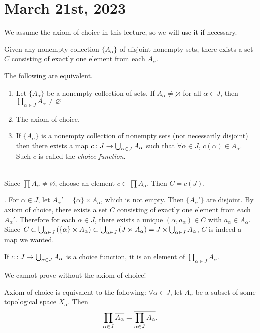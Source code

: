 \section*{March 21st, 2023}

We assume the axiom of choice in this lecture, so we will use it if necessary.

\rmk {} Given any nonempty collection \(\{A_\alpha\}\) of disjoint nonempty sets, there exists a set \(C\) consisting of exactly one element from each \(A_\alpha\).

\rmk The following are equivalent.
\begin{enumerate}
    \item Let \(\{A_\alpha\}\) be a nonempty collection of sets. If \(A_\alpha \neq \varnothing\) for all \(\alpha \in J\), then \(\prod_{\alpha \in J} A_\alpha \neq \varnothing\)
    \item The axiom of choice.
    \item If \(\{A_\alpha\}\) is a nonempty collection of nonempty sets (not necessarily disjoint) then there exists a map \(c : J \rightarrow \bigcup_{\alpha \in J} A_\alpha\) such that \(\forall \alpha \in J\), \(c(\alpha) \in A_\alpha\). Such \(c\) is called the \textit{choice function}.
\end{enumerate}

\pf \\
 Since \(\prod A_\alpha \neq \varnothing\), choose an element \(c \in \prod A_\alpha\). Then \(C = c(J)\).

 . For \(\alpha \in J\), let \(A_\alpha' = \{\alpha\} \times A_\alpha\), which is not empty. Then \(\{A_\alpha'\}\) are disjoint. By axiom of choice, there exists a set \(C\) consisting of exactly one element from each \(A_\alpha'\). Therefore for each \(\alpha \in J\), there exists a unique \((\alpha, a_\alpha) \in C\) with \(a_\alpha \in A_\alpha\). Since \(C \subset \bigcup_{\alpha \in J} \left( \{\alpha\} \times A_\alpha \right) \subset \bigcup_{\alpha \in J} \left( J \times A_\alpha \right) = J \times \bigcup_{\alpha \in J} A_\alpha\), \(C\) is indeed a map we wanted.

 If \(c : J \rightarrow \bigcup_{\alpha \in J} A_\alpha\) is a choice function, it is an element of \(\prod_{\alpha \in J} A_\alpha\).

We cannot prove  without the axiom of choice!

\rmk Axiom of choice is equivalent to the following: \(\forall \alpha \in J\), let \(A_\alpha\) be a subset of some topological space \(X_\alpha\). Then
\[
    \prod_{\alpha \in J} \overline{A_\alpha} = \overline{\prod_{\alpha \in J} A_\alpha}.
\]

